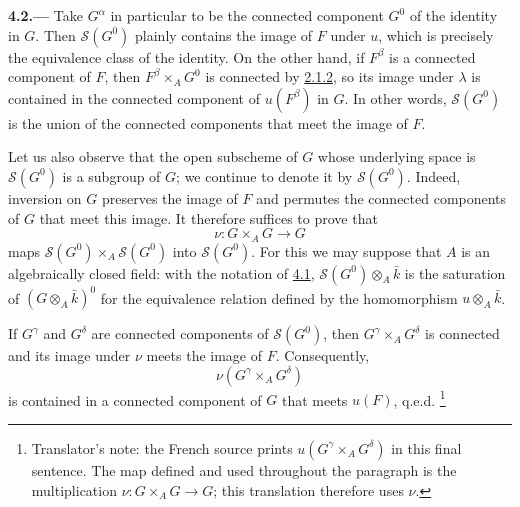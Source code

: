 
\medskip
{}\label{par:sga3-VIA-4.2}%
\noindent\textbf{4.2.---}
Take \(G^\alpha\) in particular to be the connected component
\(G^0\) of the identity in \(G\). Then \(\mathscr S(G^0)\) plainly
contains the image of \(F\) under \(u\), which is precisely the
equivalence class of the identity. On the other hand, if \(F^\beta\)
is a connected component of \(F\), then
\(F^\beta\times_A G^0\) is connected by \hyperref[lem:sga3-VIA-2.1.2]{2.1.2}, so its image under
\(\lambda\) is contained in the connected component of
\(u(F^\beta)\) in \(G\). In other words,
\(\mathscr S(G^0)\) is the union of the connected components that
meet the image of \(F\).

Let us also observe that the open subscheme of \(G\) whose underlying
space is \(\mathscr S(G^0)\) is a subgroup of \(G\); we continue to
denote it by \(\mathscr S(G^0)\). Indeed, inversion on \(G\)
preserves the image of \(F\) and permutes the connected components of
\(G\) that meet this image. It therefore suffices to prove that
\[
  \nu:G\times_A G\longrightarrow G
\]
maps
\(\mathscr S(G^0)\times_A\mathscr S(G^0)\) into
\(\mathscr S(G^0)\). For this we may suppose that \(A\) is an
algebraically closed field: with the notation of \hyperref[par:sga3-VIA-4.1]{4.1},
\(\mathscr S(G^0)\otimes_A\bar k\) is the saturation of
\((G\otimes_A\bar k)^0\) for the equivalence relation defined by the
homomorphism \(u\otimes_A\bar k\).

If \(G^\gamma\) and \(G^\delta\) are connected components of
\(\mathscr S(G^0)\), then \(G^\gamma\times_A G^\delta\) is connected
and its image under \(\nu\) meets the image of \(F\). Consequently,
\[
  \nu(G^\gamma\times_A G^\delta)
\]
is contained in a connected component of \(G\) that meets
\(u(F)\), q.e.d.\begingroup
\renewcommand{\thefootnote}{\fnsymbol{footnote}}%
\footnote[1]{Translator's note: the French source prints
\(u(G^\gamma\times_A G^\delta)\) in this final sentence. The map
defined and used throughout the paragraph is the multiplication
\(\nu:G\times_A G\to G\); this translation therefore uses \(\nu\).}%
\endgroup
